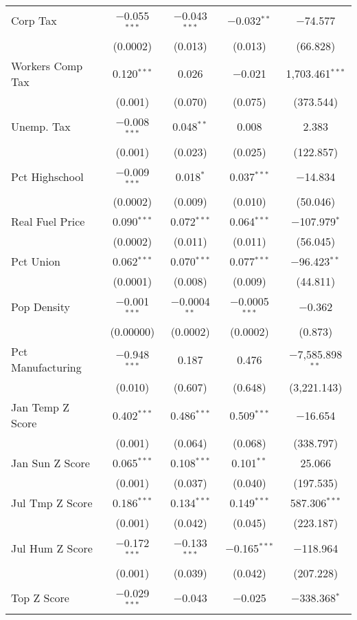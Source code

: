 \begin{table}[!htbp]
\begin{tabular}{@{\extracolsep{5pt}}lcccc}
  Corp Tax & $-$0.055$^{***}$ & $-$0.043$^{***}$ & $-$0.032$^{**}$ & $-$74.577 \\ 
  & (0.0002) & (0.013) & (0.013) & (66.828) \\ 
  Workers Comp Tax & 0.120$^{***}$ & 0.026 & $-$0.021 & 1,703.461$^{***}$ \\ 
  & (0.001) & (0.070) & (0.075) & (373.544) \\ 
  Unemp. Tax & $-$0.008$^{***}$ & 0.048$^{**}$ & 0.008 & 2.383 \\ 
  & (0.001) & (0.023) & (0.025) & (122.857) \\ 
  Pct Highschool & $-$0.009$^{***}$ & 0.018$^{*}$ & 0.037$^{***}$ & $-$14.834 \\ 
  & (0.0002) & (0.009) & (0.010) & (50.046) \\ 
  Real Fuel Price & 0.090$^{***}$ & 0.072$^{***}$ & 0.064$^{***}$ & $-$107.979$^{*}$ \\ 
  & (0.0002) & (0.011) & (0.011) & (56.045) \\ 
  Pct Union & 0.062$^{***}$ & 0.070$^{***}$ & 0.077$^{***}$ & $-$96.423$^{**}$ \\ 
  & (0.0001) & (0.008) & (0.009) & (44.811) \\ 
  Pop Density & $-$0.001$^{***}$ & $-$0.0004$^{**}$ & $-$0.0005$^{***}$ & $-$0.362 \\ 
  & (0.00000) & (0.0002) & (0.0002) & (0.873) \\ 
  Pct Manufacturing & $-$0.948$^{***}$ & 0.187 & 0.476 & $-$7,585.898$^{**}$ \\ 
  & (0.010) & (0.607) & (0.648) & (3,221.143) \\ 
  Jan Temp Z Score & 0.402$^{***}$ & 0.486$^{***}$ & 0.509$^{***}$ & $-$16.654 \\ 
  & (0.001) & (0.064) & (0.068) & (338.797) \\ 
  Jan Sun Z Score & 0.065$^{***}$ & 0.108$^{***}$ & 0.101$^{**}$ & 25.066 \\ 
  & (0.001) & (0.037) & (0.040) & (197.535) \\ 
  Jul Tmp Z Score & 0.186$^{***}$ & 0.134$^{***}$ & 0.149$^{***}$ & 587.306$^{***}$ \\ 
  & (0.001) & (0.042) & (0.045) & (223.187) \\ 
  Jul Hum Z Score & $-$0.172$^{***}$ & $-$0.133$^{***}$ & $-$0.165$^{***}$ & $-$118.964 \\ 
  & (0.001) & (0.039) & (0.042) & (207.228) \\ 
  Top Z Score & $-$0.029$^{***}$ & $-$0.043 & $-$0.025 & $-$338.368$^{*}$ \\ 

\end{tabular}
\end{table}
